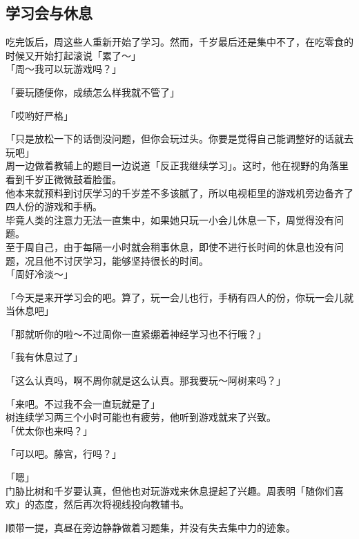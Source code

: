 \subsection{学习会与休息}

吃完饭后，周这些人重新开始了学习。然而，千岁最后还是集中不了，在吃零食的时候又开始打起滚说「累了～」\\

「周～我可以玩游戏吗？」

「要玩随便你，成绩怎么样我就不管了」

「哎哟好严格」

「只是放松一下的话倒没问题，但你会玩过头。你要是觉得自己能调整好的话就去玩吧」\\

周一边做着教辅上的题目一边说道「反正我继续学习」。这时，他在视野的角落里看到千岁正微微鼓着脸蛋。\\

他本来就预料到讨厌学习的千岁差不多该腻了，所以电视柜里的游戏机旁边备齐了四人份的游戏和手柄。\\

毕竟人类的注意力无法一直集中，如果她只玩一小会儿休息一下，周觉得没有问题。\\

至于周自己，由于每隔一小时就会稍事休息，即使不进行长时间的休息也没有问题，况且他不讨厌学习，能够坚持很长的时间。\\

「周好冷淡～」

「今天是来开学习会的吧。算了，玩一会儿也行，手柄有四人的份，你玩一会儿就当休息吧」

「那就听你的啦～不过周你一直紧绷着神经学习也不行哦？」

「我有休息过了」

「这么认真吗，啊不周你就是这么认真。那我要玩～阿树来吗？」

「来吧。不过我不会一直玩就是了」\\

树连续学习两三个小时可能也有疲劳，他听到游戏就来了兴致。\\

「优太你也来吗？」

「可以吧。藤宫，行吗？」

「嗯」\\

门胁比树和千岁要认真，但他也对玩游戏来休息提起了兴趣。周表明「随你们喜欢」的态度，然后再次将视线投向教辅书。

顺带一提，真昼在旁边静静做着习题集，并没有失去集中力的迹象。\\


